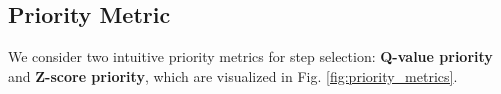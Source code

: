 






\subsection{Priority Metric}
\label{sec:priority_metric}

We consider two intuitive priority metrics for step selection: \textbf{Q-value priority} and \textbf{Z-score priority}, which are visualized in Fig. \ref{fig:priority_metrics}.


